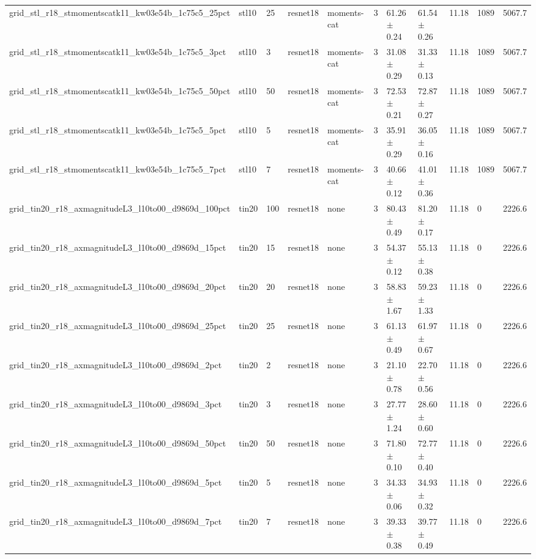 \begin{tabular}{lllllllllll}
grid_stl_r18_stmomentscatk11_kw03e54b_1c75c5_25pct & stl10 & 25 & resnet18 & moments-cat & 3 & 61.26 $\pm$ 0.24 & 61.54 $\pm$ 0.26 & 11.18 & 1089 & 5067.7 \\
grid_stl_r18_stmomentscatk11_kw03e54b_1c75c5_3pct & stl10 & 3 & resnet18 & moments-cat & 3 & 31.08 $\pm$ 0.29 & 31.33 $\pm$ 0.13 & 11.18 & 1089 & 5067.7 \\
grid_stl_r18_stmomentscatk11_kw03e54b_1c75c5_50pct & stl10 & 50 & resnet18 & moments-cat & 3 & 72.53 $\pm$ 0.21 & 72.87 $\pm$ 0.27 & 11.18 & 1089 & 5067.7 \\
grid_stl_r18_stmomentscatk11_kw03e54b_1c75c5_5pct & stl10 & 5 & resnet18 & moments-cat & 3 & 35.91 $\pm$ 0.29 & 36.05 $\pm$ 0.16 & 11.18 & 1089 & 5067.7 \\
grid_stl_r18_stmomentscatk11_kw03e54b_1c75c5_7pct & stl10 & 7 & resnet18 & moments-cat & 3 & 40.66 $\pm$ 0.12 & 41.01 $\pm$ 0.36 & 11.18 & 1089 & 5067.7 \\
grid_tin20_r18_axmagnitudeL3_l10to00_d9869d_100pct & tin20 & 100 & resnet18 & none & 3 & 80.43 $\pm$ 0.49 & 81.20 $\pm$ 0.17 & 11.18 & 0 & 2226.6 \\
grid_tin20_r18_axmagnitudeL3_l10to00_d9869d_15pct & tin20 & 15 & resnet18 & none & 3 & 54.37 $\pm$ 0.12 & 55.13 $\pm$ 0.38 & 11.18 & 0 & 2226.6 \\
grid_tin20_r18_axmagnitudeL3_l10to00_d9869d_20pct & tin20 & 20 & resnet18 & none & 3 & 58.83 $\pm$ 1.67 & 59.23 $\pm$ 1.33 & 11.18 & 0 & 2226.6 \\
grid_tin20_r18_axmagnitudeL3_l10to00_d9869d_25pct & tin20 & 25 & resnet18 & none & 3 & 61.13 $\pm$ 0.49 & 61.97 $\pm$ 0.67 & 11.18 & 0 & 2226.6 \\
grid_tin20_r18_axmagnitudeL3_l10to00_d9869d_2pct & tin20 & 2 & resnet18 & none & 3 & 21.10 $\pm$ 0.78 & 22.70 $\pm$ 0.56 & 11.18 & 0 & 2226.6 \\
grid_tin20_r18_axmagnitudeL3_l10to00_d9869d_3pct & tin20 & 3 & resnet18 & none & 3 & 27.77 $\pm$ 1.24 & 28.60 $\pm$ 0.60 & 11.18 & 0 & 2226.6 \\
grid_tin20_r18_axmagnitudeL3_l10to00_d9869d_50pct & tin20 & 50 & resnet18 & none & 3 & 71.80 $\pm$ 0.10 & 72.77 $\pm$ 0.40 & 11.18 & 0 & 2226.6 \\
grid_tin20_r18_axmagnitudeL3_l10to00_d9869d_5pct & tin20 & 5 & resnet18 & none & 3 & 34.33 $\pm$ 0.06 & 34.93 $\pm$ 0.32 & 11.18 & 0 & 2226.6 \\
grid_tin20_r18_axmagnitudeL3_l10to00_d9869d_7pct & tin20 & 7 & resnet18 & none & 3 & 39.33 $\pm$ 0.38 & 39.77 $\pm$ 0.49 & 11.18 & 0 & 2226.6 \\

\end{tabular}
